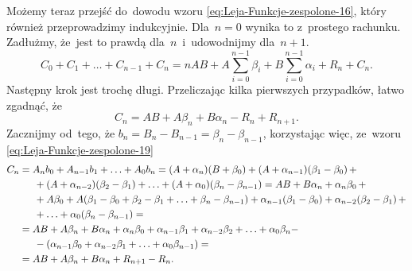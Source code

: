 \documentclass[a4paper,11pt]{article}
\numberwithin{equation}{section}
\begin{document}
Możemy teraz przejść do~dowodu wzoru \eqref{eq:Leja-Funkcje-zespolone-16},
który również przeprowadzimy indukcyjnie. Dla~$n = 0$ wynika to z~prostego
rachunku. Zadłużmy, że~jest to prawdą dla~$n$~i~udowodnijmy dla~$n + 1$.
\begin{equation}
  \label{eq:Leja-Funkcje-zespolone-24}
  C_{ 0 } + C_{ 1 } + \ldots + C_{ n - 1 } + C_{ n } =
  n AB + A \sum_{ i = 0 }^{ n - 1 } \beta_{ i } + B \sum_{ i = 0 }^{ n - 1 }
  \alpha_{ i } + R_{ n } + C_{ n }.
\end{equation}
Następny krok jest trochę długi. Przeliczając kilka pierwszych
przypadków, łatwo zgadnąć, że
\begin{equation}
  \label{eq:Leja-Funkcje-zespolone-25}
  C_{ n } = AB + A \beta_{ n } + B \alpha_{ n } - R_{ n } + R_{ n + 1 }.
\end{equation}
Zacznijmy od~tego, że
$b_{ n } = B_{ n } - B_{ n - 1 } = \beta_{ n } - \beta_{ n - 1 }$,
korzystając więc, ze~wzoru \eqref{eq:Leja-Funkcje-zespolone-19}
\begin{equation}
  \label{eq:Leja-Funkcje-zespolone-26}
  \begin{split}
    C_{ n }
    &= A_{ n } b_{ 0 } + A_{ n - 1 } b_{ 1 } + \ldots + A_{ 0 }
      b_{ n } = ( A + \alpha_{ n } ) ( B + \beta_{ 0 } ) + ( A + \alpha_{ n - 1 } )
      ( \beta_{ 1 } - \beta_{ 0 } ) \, + \\
    &\hspace{1.5em} + ( A + \alpha_{ n - 2 } )( \beta_{ 2 } - \beta_{ 1 } ) + \ldots
      + ( A + \alpha_{ 0 } ) ( \beta_{ n } - \beta_{ n - 1 } ) =
      AB + B \alpha_{ n } + \alpha_{ n } \beta_{ 0 } \, + \\
    &\hspace{1.5em} + A \beta_{ 0 } + A ( \beta_{ 1 } - \beta_{ 0 } + \beta_{ 2 }
      - \beta_{ 1 } + \ldots + \beta_{ n } - \beta_{ n - 1 } ) + \alpha_{ n - 1 } ( \beta_{ 1 } - \beta_{ 0 } )
      + \alpha_{ n - 2 } ( \beta_{ 2 } - \beta_{ 1 } ) \, + \\
    &\hspace{1.5em} + \ldots + \alpha_{ 0 } ( \beta_{ n } - \beta_{ n - 1 } ) = \\
    &=
      AB + A \beta_{ n } + B \alpha_{ n } + \alpha_{ n } \beta_{ 0 } + \alpha_{ n - 1 } \beta_{ 1 }
      + \alpha_{ n - 2 } \beta_{ 2 } + \ldots + \alpha_{ 0 } \beta_{ n } - \\
    &\hspace{1.5em} - ( \alpha_{ n - 1 } \beta_{ 0 } + \alpha_{ n - 2 } \beta_{ 1 }
      + \ldots + \alpha_{ 0 } \beta_{ n - 1 } ) = \\
    &= AB + A \beta_{ n } + B \alpha_{ n } + R_{ n + 1 } - R_{ n }.
  \end{split}
\end{equation}
\end{document}
